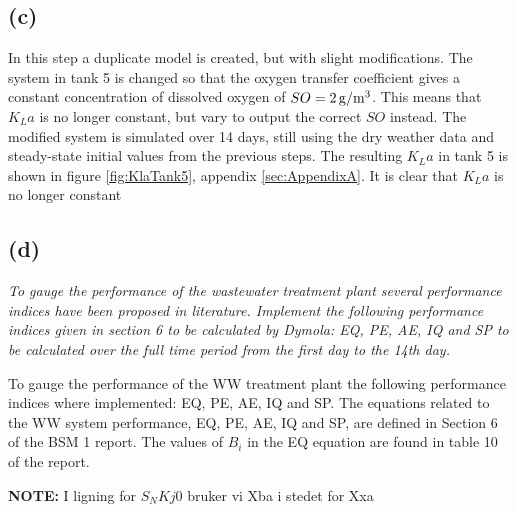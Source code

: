 \subsection*{(c)}
In this step a duplicate model is created, but with slight modifications. The system in tank 5 is changed so that the oxygen transfer coefficient gives a constant concentration of dissolved oxygen of $SO = \unit[2]{g/m^3}$. This means that $K_La$ is no longer constant, but vary to output the correct $SO$ instead. The modified system is simulated over 14 days, still using the dry weather data and steady-state initial values from the previous steps. The resulting $K_La$ in tank 5 is shown in figure \ref{fig:KlaTank5}, appendix \ref{sec:AppendixA}. It is clear that $K_La$ is no longer constant

\subsection*{(d)}
\textit{To gauge the performance of the wastewater treatment plant several performance indices have
been proposed in literature. Implement the following performance indices given in section 6
to be calculated by Dymola: EQ, PE, AE, IQ and SP to be calculated over the full time period
from the first day to the 14th day.}

To gauge the performance of the WW treatment plant the following performance indices where implemented: EQ, PE, AE, IQ and SP. The equations related to the WW system performance, EQ, PE, AE, IQ and SP, are defined in Section 6 of the BSM 1 report. The values of $B_i$ in the EQ equation are found in table 10 of the report.  

\textbf{NOTE:} I ligning for $S_NKj0$ bruker vi Xba i stedet for Xxa 
